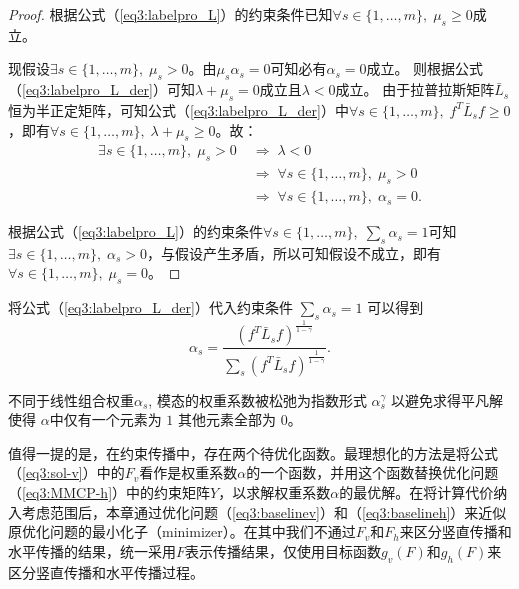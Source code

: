 \begin{proof}
    根据公式（\ref{eq3:labelpro_L}）的约束条件已知$ \forall s \in \{1,\dots,m\}, \;\mu_s \ge 0$成立。

    现假设$\exists s \in \{1,\dots,m\}, \; \mu_s>0 $。由$ \mu_s\alpha_s=0 $可知必有$\alpha_s=0 $成立。
    则根据公式（\ref{eq3:labelpro_L_der}）可知$\lambda + \mu_s = 0 $成立且$ \lambda<0 $成立。
    由于拉普拉斯矩阵$ {\bar{{L}}}_s $恒为半正定矩阵\cite{chung1997spectral}，可知公式（\ref{eq3:labelpro_L_der}）中$\forall s \in \{1,\dots,m\}, \;{f}^T {\bar{{L}}}_s{f} \ge 0$，即有$\forall s \in \{1,\dots,m\}, \; \lambda + \mu_s \ge 0 $。故：
    \begin{equation}
        \begin{split}
        \exists s \in \{1,\dots,m\}, \; \mu_s>0\; &\Rightarrow \;\lambda<0 \\&\Rightarrow \;\forall s \in \{1,\dots,m\}, \; \mu_s>0 \\&\Rightarrow \; \forall s \in \{1,\dots,m\}, \;\alpha_s=0.     
        \end{split}
    \end{equation}

    根据公式（\ref{eq3:labelpro_L}）的约束条件$ \forall s \in \{1,\dots,m\}, \;\sum_s \alpha_s = 1$可知$ \exists s \in \{1,\dots,m\}, \;\alpha_s>0$，与假设产生矛盾，所以可知假设不成立，即有$\forall s \in \{1,\dots,m\}, \; \mu_s=0 $。
\end{proof}

将公式（\ref{eq3:labelpro_L_der}）代入约束条件 $ \sum_s \alpha_s=1 $ 可以得到
\begin{equation}
\alpha_s = \frac{({f}^T \bar{{L}}_s{f})^\frac{1}{1-\gamma}}{\sum_s({f}^T \bar{{L}}_s{f})^\frac{1}{1-\gamma}}.
\end{equation}

不同于线性组合权重$ \alpha_s$, 模态的权重系数被松弛为指数形式 $ \alpha_s^\gamma $ 以避免求得平凡解使得 $ {\alpha} $中仅有一个元素为 $ 1 $ 其他元素全部为 $ 0 $。

值得一提的是，在约束传播中，存在两个待优化函数。最理想化的方法是将公式（\ref{eq3:sol-v}）中的$ {F}_v $看作是权重系数$\alpha$的一个函数，并用这个函数替换优化问题（\ref{eq3:MMCP-h}）中的约束矩阵$Y$，以求解权重系数$\alpha$的最优解。在将计算代价纳入考虑范围后，本章通过优化问题（\ref{eq3:baselinev}）和（\ref{eq3:baselineh}）来近似原优化问题的最小化子（minimizer）。在其中我们不通过$F_v$和$F_h$来区分竖直传播和水平传播的结果，统一采用$F$表示传播结果，仅使用目标函数$g_v({F})$和$g_h({F})$来区分竖直传播和水平传播过程。

